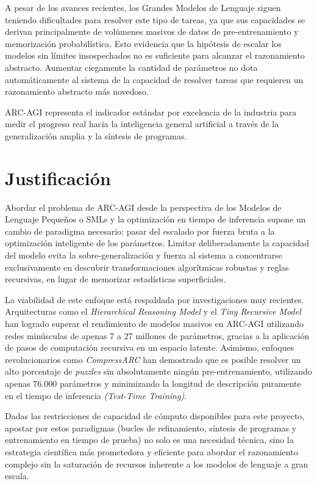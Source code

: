 \documentclass[11pt,a4paper,spanish]{book}
\numberwithin{equation}{chapter}
\numberwithin{figure}{chapter}
\begin{document}
A pesar de los avances recientes, los Grandes Modelos de Lenguaje siguen teniendo dificultades para resolver este tipo de tareas, ya que sus capacidades se derivan principalmente de
volúmenes masivos de datos de pre-entrenamiento y memorización probabilística. Esto evidencia que la hipótesis de escalar los modelos sin límites insospechados no es suficiente
para alcanzar el razonamiento abstracto. Aumentar ciegamente la cantidad de parámetros no dota automáticamente al sistema de la capacidad de resolver tareas que requieren un razonamiento
abstracto más novedoso.

ARC-AGI representa el indicador estándar por excelencia de la industria para medir el progreso real hacia la inteligencia general artificial a través de la generalización
amplia y la síntesis de programas.

\section{Justificación}

Abordar el problema de ARC-AGI desde la perspectiva de los Modelos de Lenguaje Pequeños o SMLs y la optimización en tiempo de inferencia supone un cambio de paradigma necesario: 
pasar del escalado por fuerza bruta a la optimización inteligente de los parámetros. Limitar deliberadamente la capacidad del modelo evita la sobre-generalización y fuerza al sistema a 
concentrarse exclusivamente en descubrir transformaciones algorítmicas robustas y reglas recursivas, en lugar de memorizar estadísticas superficiales.

La viabilidad de este enfoque está respaldada por investigaciones muy recientes. Arquitecturas como el \textit{Hierarchical Reasoning Model} y el \textit{Tiny Recursive Model} han
logrado superar el rendimiento de modelos masivos en ARC-AGI utilizando redes minúsculas de apenas 7 a 27 millones de parámetros, gracias a la aplicación de pasos de 
computación recursiva en un espacio latente. Asimismo, enfoques revolucionarios como \textit{CompressARC} han demostrado que es posible resolver un alto porcentaje de \textit{puzzles} sin absolutamente ningún 
pre-entrenamiento, utilizando apenas 76.000 parámetros y minimizando la longitud de descripción puramente en el tiempo de inferencia \textit{(Test-Time Training)}.

Dadas las restricciones de capacidad de cómputo disponibles para este proyecto, apostar por estos paradigmas (bucles de refinamiento, síntesis de programas y entrenamiento en tiempo de prueba) 
no solo es una necesidad técnica, sino la estrategia científica más prometedora y eficiente para abordar el razonamiento complejo sin la saturación de recursos inherente a los modelos de lenguaje
a gran escala.
\end{document}
